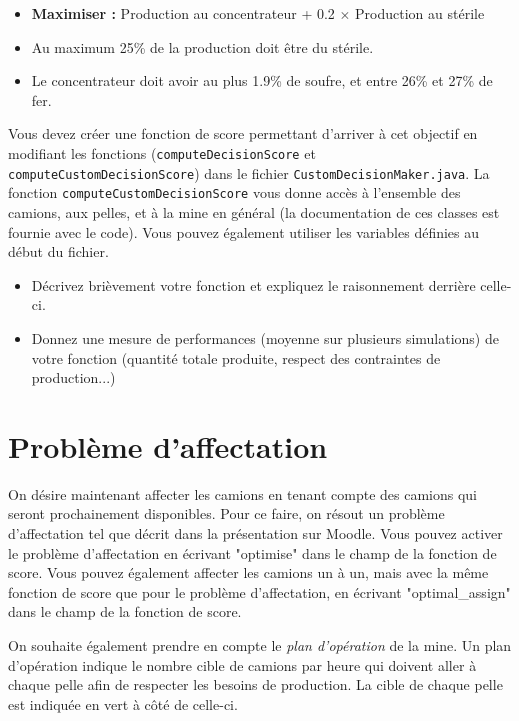 \documentclass[letterpaper,12pt]{article}
\begin{document}
	\begin{itemize}
		\item \textbf{Maximiser : }  Production au concentrateur + 0.2 $\times$ Production au stérile
		\item Au maximum 25\% de la production doit être du stérile.
		\item Le concentrateur doit avoir au plus 1.9\% de soufre, et entre 26\% et 27\% de fer.
	\end{itemize}
	
	Vous devez créer une fonction de score permettant d'arriver à cet objectif en modifiant les fonctions (\verb!computeDecisionScore!  et \verb!computeCustomDecisionScore!) dans le fichier \verb!CustomDecisionMaker.java!. La fonction \verb!computeCustomDecisionScore! vous donne accès à l'ensemble des camions, aux pelles, et à la mine en général (la documentation de ces classes est fournie avec le code). Vous pouvez également utiliser les variables définies au début du fichier. 
	
	\begin{itemize}
		\item Décrivez brièvement votre fonction et expliquez le raisonnement derrière celle-ci.
		\item Donnez une mesure de performances (moyenne sur plusieurs simulations) de votre fonction (quantité totale produite, respect des contraintes de production...)
	\end{itemize}
	
	
	
	\section{Problème d'affectation}
	
	On désire maintenant affecter les camions en tenant compte des camions qui seront prochainement disponibles. Pour ce faire, on résout un problème d'affectation tel que décrit dans la présentation sur Moodle. Vous pouvez activer le problème d'affectation en écrivant "optimise" dans le champ de la fonction de score. Vous pouvez également affecter les camions un à un, mais avec la même fonction de score que pour le problème d'affectation, en écrivant "optimal\_assign" dans le champ de la fonction de score.
	
	On souhaite également prendre en compte le \textit{plan d'opération} de la mine. Un plan d'opération indique le nombre cible de camions par heure qui doivent aller à chaque pelle afin de respecter les besoins de production. La cible de chaque pelle est indiquée en vert à côté de celle-ci.
	
\end{document}
